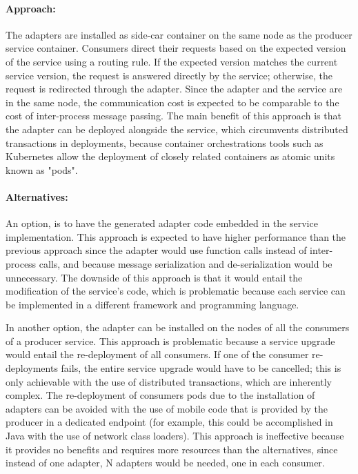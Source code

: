 \paragraph{Approach:}
The adapters are installed as side-car container on the same node as the producer service container.
Consumers direct their requests based on the expected version of the service using a routing rule.
If the expected version matches the current service version, the request is answered directly by the service;
otherwise, the request is redirected through the adapter.
Since the adapter and the service are in the same node, the communication cost is expected to be comparable to the cost of inter-process message passing.
The main benefit of this approach is that the adapter can be deployed alongside the service,
which circumvents distributed transactions in deployments,
because container orchestrations tools such as Kubernetes allow the deployment of closely related containers as atomic units known as "pods".

\paragraph{Alternatives:}
An option, is to have the generated adapter code embedded in the service implementation.
This approach is expected to have higher performance than the previous approach since
the adapter would use function calls instead of inter-process calls, and because message serialization and de-serialization would be unnecessary.
The downside of this approach is that it would entail the modification of the service's code, which is problematic because each service can be implemented in a different framework and programming language.

In another option, the adapter can be installed on the nodes of all the consumers of a producer service.
This approach is problematic because a service upgrade would entail the re-deployment of all consumers.
If one of the consumer re-deployments fails, the entire service upgrade would have to be cancelled;
this is only achievable with the use of distributed transactions, which are inherently complex.
The re-deployment of consumers pods due to the installation of adapters can be avoided with the use of mobile code that is provided by the producer in a dedicated endpoint
(for example, this could be accomplished in Java with the use of network class loaders).
This approach is ineffective because it provides no benefits and requires more resources than the alternatives, since
instead of one adapter, N adapters would be needed, one in each consumer.

